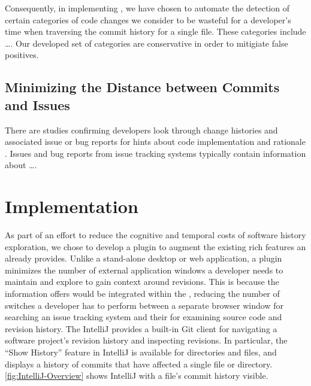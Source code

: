 Consequently, in implementing , we have chosen to automate the detection of certain categories of code changes we consider to be wasteful for a developer's time when traversing the commit history for a single file.
These categories include \dots.
Our developed set of categories are conservative in order to mitigiate false positives.

\subsection{Minimizing the Distance between Commits and Issues}
\label{subsec:Minimize-Commit-Issue-Distance}

There are studies confirming developers look through change histories and associated issue or bug reports for hints about code implementation and rationale \cite{ko_information_2007,robillard_turnover-induced_2021, rastkar_why_2013}.
Issues and bug reports from issue tracking systems typically contain information about \dots.


\section{Implementation}
\label{sec:Implementation}

As part of an effort to reduce the cognitive and temporal costs of software history exploration, we chose to develop a plugin to augment the existing rich features an  already provides.
Unlike a stand-alone desktop or web application, a plugin minimizes the number of external application windows a developer needs to maintain and explore to gain context around revisions. 
This is because the information  offers would be integrated within the , reducing the number of switches a developer has to perform between a separate browser window for searching an issue tracking system and their  for examining source code and revision history.
The IntelliJ  provides a built-in Git client  for navigating a software project's revision history and inspecting revisions. 
In particular, the ``Show History'' feature in IntelliJ is available for directories and files, and displays a history of commits that have affected a single file or directory.
\autoref{fig:IntelliJ-Overview} shows IntelliJ with a file's commit history visible.

